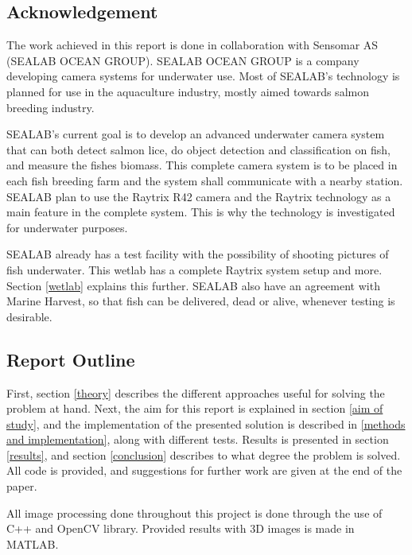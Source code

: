 

\subsection{Acknowledgement}

The work achieved in this report is done in collaboration with Sensomar AS (SEALAB OCEAN GROUP). 
SEALAB OCEAN GROUP is a company developing camera systems for underwater use. Most of SEALAB's technology is planned for use in the aquaculture industry, mostly aimed towards salmon breeding industry.\cite{website:sealab}

SEALAB's current goal is to develop an advanced underwater camera system that can both detect salmon lice, do object detection and classification on fish, and measure the fishes biomass. This complete camera system is to be placed in each fish breeding farm and the system shall communicate with a nearby station. SEALAB plan to use the Raytrix R42 camera and the Raytrix technology as a main feature in the complete system. This is why the technology is investigated for underwater purposes.

SEALAB already has a test facility with the possibility of shooting pictures of fish underwater. This wetlab has a complete Raytrix system setup and more. Section \ref{wetlab} explains this further. SEALAB also have an agreement with Marine Harvest, so that fish can be delivered, dead or alive, whenever testing is desirable.




\subsection{Report Outline} \label{report_outline}

First, section \ref{theory} describes the different approaches useful for solving the problem at hand. Next, the aim for this report is explained in section \ref{aim of study}, and the implementation of the presented solution is described in \ref{methods and implementation}, along with different tests. Results is presented in section \ref{results}, and section \ref{conclusion} describes to what degree the problem is solved. All code is provided, and suggestions for further work are given at the end of the paper.

All image processing done throughout this project is done through the use of C++ and OpenCV library. Provided results with 3D images is made in MATLAB.



